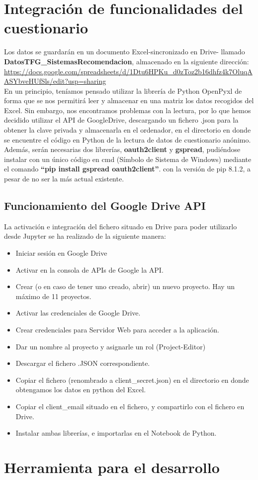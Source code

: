 \section{Integración de funcionalidades del cuestionario}
Los datos se guardarán en un documento Excel-sincronizado en Drive-  llamado  \textbf{DatosTFG\_SistemasRecomendacion}, almacenado en la siguiente dirección: \url{https://docs.google.com/spreadsheets/d/1Dtu6HPKu_d0zToz2b16dhfz4k7OluqAASYbveHUfSls/edit?usp=sharing} \\En un principio, teníamos pensado utilizar la librería de Python  OpenPyxl  de forma que se nos permitirá leer y almacenar en una matriz los datos recogidos del Excel. Sin embargo, nos encontramos problemas con la lectura, por lo que hemos decidido utilizar el API de GoogleDrive, descargando un fichero .json para la obtener la clave privada y almacenarla en el ordenador, en el directorio en donde se encuentre el código en Python de la lectura de datos de cuestionario anónimo. \\Además, serán necesarias dos librerías, \textbf{oauth2client} y \textbf{gspread}, pudiéndose instalar con un único código en cmd (Símbolo de Sistema de Windows)  mediante el comando \textbf{``pip install gspread oauth2client''}. \nocite{twilio:api}con la versión de pip 8.1.2, a pesar de no ser la más actual existente. 

\subsection{Funcionamiento del Google Drive API }
La activación e integración del fichero situado en Drive para poder utilizarlo desde Jupyter se ha realizado de la siguiente manera: 
\begin{itemize}
\item Iniciar sesión en Google Drive
\item Activar en la consola de APIs de Google la API. 
\item Crear (o en caso de tener uno creado, abrir) un nuevo proyecto. Hay un máximo de 11 proyectos. 
\item Activar las credenciales de Google Drive. 
\item Crear credenciales para Servidor Web para acceder a la aplicación. 
\item Dar un nombre al proyecto y asignarle un rol (Project-Editor)
\item Descargar el fichero .JSON correspondiente. 
\item Copiar el fichero (renombrado a client\_secret.json) en el directorio en donde obtengamos los datos en python del Excel. 
\item Copiar el client\_email situado en el fichero, y compartirlo con el fichero en Drive.
\item Instalar ambas librerías, e importarlas en el Notebook  de Python. 
\end{itemize}

\section{Herramienta para el desarrollo}

